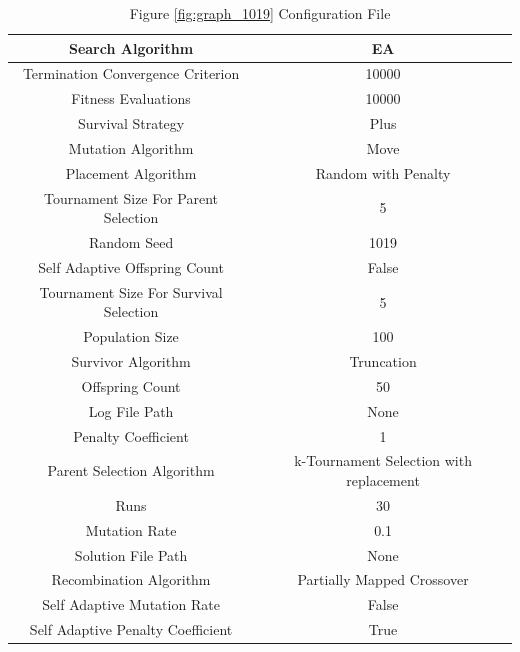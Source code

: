 \documentclass{standalone}
\begin{document}
\begin{table}[!htb]
	\centering
	\caption{Figure \ref{fig:graph_1019} Configuration File}
	\label{tab:graph_1019}
	\begin{tabular}{| c | c |}
		\hline
		Search Algorithm		& EA		 \\
		\hline
		Termination Convergence Criterion		& 10000		 \\
		\hline
		Fitness Evaluations		& 10000		 \\
		\hline
		Survival Strategy		& Plus		 \\
		\hline
		Mutation Algorithm		& Move		 \\
		\hline
		Placement Algorithm		& Random with Penalty		 \\
		\hline
		Tournament Size For Parent Selection		& 5		 \\
		\hline
		Random Seed		& 1019		 \\
		\hline
		Self Adaptive Offspring Count		& False		 \\
		\hline
		Tournament Size For Survival Selection		& 5		 \\
		\hline
		Population Size		& 100		 \\
		\hline
		Survivor Algorithm		& Truncation		 \\
		\hline
		Offspring Count		& 50		 \\
		\hline
		Log File Path		& None		 \\
		\hline
		Penalty Coefficient		& 1		 \\
		\hline
		Parent Selection Algorithm		& k-Tournament Selection with replacement		 \\
		\hline
		Runs		& 30		 \\
		\hline
		Mutation Rate		& 0.1		 \\
		\hline
		Solution File Path		& None		 \\
		\hline
		Recombination Algorithm		& Partially Mapped Crossover		 \\
		\hline
		Self Adaptive Mutation Rate		& False		 \\
		\hline
		Self Adaptive Penalty Coefficient		& True		 \\
		\hline
	\end{tabular}
\end{table}
\end{document}
